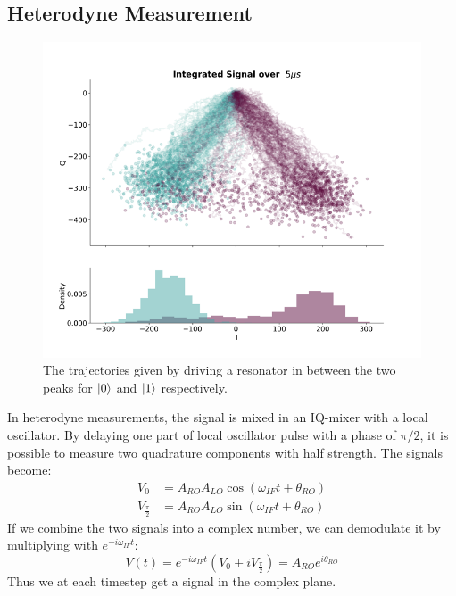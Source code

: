 \subsection{Heterodyne Measurement}\label{sec:heterodyne_measurement}
\begin{figure}[t]
    \centering
    \includegraphics{Figs/Theory/stochastic_signal.png}
    \caption{The trajectories given by driving a resonator in between the two peaks for $\ket{0}$ and $\ket{1}$ respectively.}
    \label{fig:stochastic_signal_hetereodyne}
\end{figure}
In heterodyne measurements, the signal is mixed in an IQ-mixer with a local oscillator. By delaying one part of local oscillator pulse with a phase of $\pi / 2$, it is possible to measure two quadrature components with half strength. The signals become:
\begin{align}
    V_0               &= A_{RO}A_{LO} \cos(\omega_{IF}t + \theta_{RO}) \\
    V_{\frac{\pi}{2}} &= A_{RO}A_{LO} \sin(\omega_{IF}t + \theta_{RO})
\end{align}
If we combine the two signals into a complex number, we can demodulate it by multiplying with $e^{-i\omega_{IF}t}$:
\begin{equation}
    V(t) = e^{-i\omega_{IF} t} (V_0 + i V_{\frac{\pi}{2}}) = A_{RO} e^{i\theta_{RO}}
\end{equation}
Thus we at each timestep get a signal in the complex plane. 

